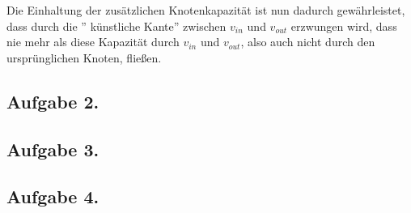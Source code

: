 \documentclass[11pt,a4paper,ngerman]{article}
\begin{document}
\begin{enumerate}[a)]
Die Einhaltung der zusätzlichen Knotenkapazität ist nun dadurch gewährleistet,
dass durch die '' künstliche Kante'' zwischen $v_{in}$ und $v_{out}$ erzwungen wird,
dass nie mehr als diese Kapazität durch $v_{in}$ und $v_{out}$, also auch nicht 
durch den ursprünglichen Knoten, fließen.
\end{enumerate}

\subsection*{Aufgabe 2.}


\subsection*{Aufgabe 3.}


\subsection*{Aufgabe 4.}



\label{LastPage}
\end{document}
